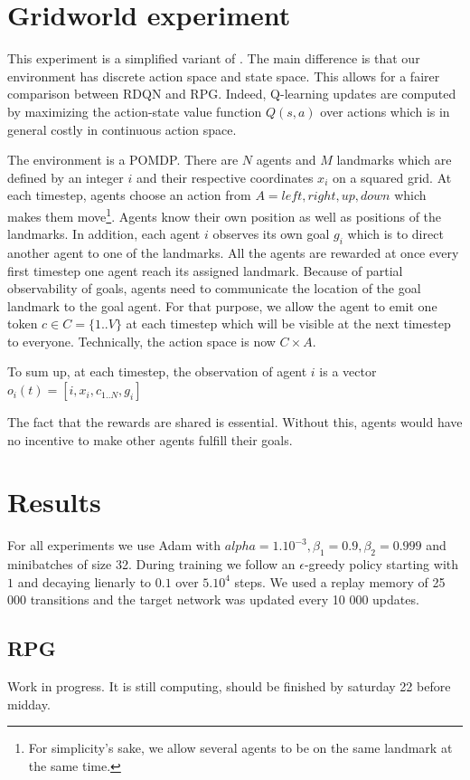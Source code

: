 \documentclass{article} %
\begin{document}
\section{Gridworld experiment}
This experiment is a simplified variant of \cite{mordatch2017emergence}. The main difference is that our environment has discrete action space and state space. This allows for a fairer comparison between RDQN and RPG. Indeed, Q-learning updates are computed by maximizing the action-state value function $Q(s,a)$ over actions which is in general costly in continuous action space. 

The environment is a POMDP. There are $N$ agents and $M$ landmarks which are defined by an integer $i$ and their respective coordinates $x_i$ on a squared grid. At each timestep, agents choose an action from $A={left, right, up, down}$ which makes them move\footnote{For simplicity's sake, we allow several agents to be on the same landmark at the same time.}. Agents know their own position as well as positions of the landmarks. In addition, each agent $i$ observes its own goal $g_i$ which is to direct another agent to one of the landmarks. All the agents are rewarded at once every first timestep one agent reach its assigned landmark. Because of partial observability of goals, agents need to communicate the location of the goal landmark to the goal agent. For that purpose, we allow the agent to emit one token $c \in C = \{1..V\}$ at each timestep which will be visible at the next timestep to everyone. Technically, the action space is now $C \times A$.

To sum up, at each timestep, the observation of agent $i$ is a vector $o_i(t) = [i, x_i, c_{1..N}, g_i]$

The fact that the rewards are shared is essential. Without this, agents would have no incentive to make other agents fulfill their goals.

\section{Results}
For all experiments we use Adam \cite{kingma2014adam} with $alpha=1.10^{-3}, \beta_1=0.9, \beta_2=0.999$ and minibatches of size 32. During training we follow an $\epsilon$-greedy policy starting with $1$ and decaying lienarly to $0.1$ over $5.10^4$ steps. We used a replay memory of 25 000 transitions and the target network was updated every 10 000 updates.
\subsection{RPG}
Work in progress. It is still computing, should be finished by saturday 22 before midday.
\end{document}
